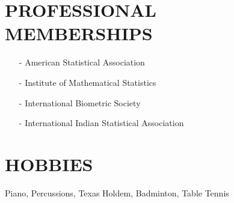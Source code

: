 \documentclass[11pt]{res} %
\begin{document}
\begin{resume}
\section{PROFESSIONAL MEMBERSHIPS}
\begin{itemize}[leftmargin=*] \itemsep -2pt
\item[-] American Statistical Association
\item[-] Institute of Mathematical Statistics
\item[-] International Biometric Society
\item[-] International Indian Statistical Association 
\end{itemize}

\section{HOBBIES} 
Piano, Percussions, Texas Holdem, Badminton, Table Tennis
 
\end{resume}
\end{document}
